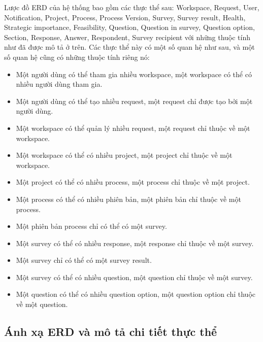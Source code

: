 \par
Lược đồ ERD của hệ thống bao gồm các thực thể sau: Workspace, Request,
User, Notification, Project, Process, Process Version, Survey, Survey result, Health, Strategic importance, Feasibility,
Question, Question in survey, Question option, Section, Response, Answer, Respondent, Survey recipient với những
thuộc tính như đã được mô tả ở trên. Các thực thể này có một số
quan hệ như sau, và một số quan hệ cũng có những thuộc tính riêng nó:
\begin{itemize}
    \item Một người dùng có thể tham gia nhiều workspace, một
    workspace có thể có nhiều người dùng tham gia.
    \item Một người dùng có thể tạo nhiều request, một request
    chỉ được tạo bởi một người dùng.
    \item Một workspace có thể quản lý nhiều request, một request
    chỉ thuộc về một workspace.
    \item Một workspace có thể có nhiều project, một project
    chỉ thuộc về một workspace.
    \item Một project có thể có nhiều process, một process
    chỉ thuộc về một project.
    \item Một process có thể có nhiều phiên bản, một phiên bản
    chỉ thuộc về một process.
    \item Một phiên bản process chỉ có thể có một survey.
    \item Một survey có thể có nhiều response, một response chỉ thuộc về một survey.
    \item Một survey chỉ có thể có một survey result.
    \item Một survey có thể có nhiều question, một question chỉ thuộc về một survey.
    \item Một question có thể có nhiều question option, một question option chỉ thuộc về một question.
\end{itemize}

\newpage
\subsection{Ánh xạ ERD và mô tả chi tiết thực thể}


